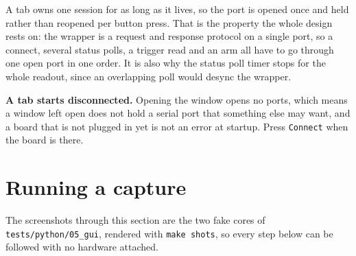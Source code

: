 \documentclass[../manual.tex]{subfiles}
\begin{document}
A tab owns one session for as long as it lives, so the port is opened once and held rather than reopened per button press. That is the property the whole design rests on: the wrapper is a request and response protocol on a single port, so a connect, several status polls, a trigger read and an arm all have to go through one open port in one order. It is also why the status poll timer stops for the whole readout, since an overlapping poll would desync the wrapper.

\textbf{A tab starts disconnected.} Opening the window opens no ports, which means a window left open does not hold a serial port that something else may want, and a board that is not plugged in yet is not an error at startup. Press \texttt{Connect} when the board is there.

\section{Running a capture}
\label{sec:gui_capture}

The screenshots through this section are the two fake cores of \texttt{tests/python/05\_gui}, rendered with \texttt{make shots}, so every step below can be followed with no hardware attached.
\end{document}
